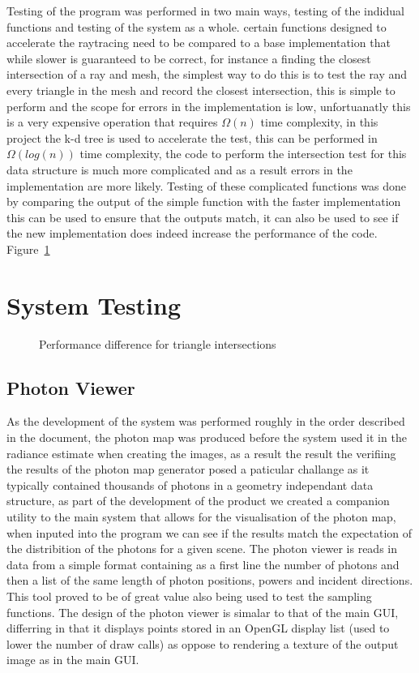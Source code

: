 Testing of the program was performed in two main ways, testing of the indidual functions and testing of the system as a whole.
certain functions designed to accelerate the raytracing need to be compared to a base implementation that while slower is
guaranteed to be correct, for instance a finding the closest intersection of a ray and mesh, the simplest way to do this
is to test the ray and every triangle in the mesh and record the closest intersection, this is simple to perform and
the scope for errors in the implementation is low, unfortuanatly this is a very expensive operation that requires $\Omega(n)$
time complexity, in this project the k-d tree is used to accelerate the test, this can be performed in $\Omega(log(n))$ time
complexity, the code to perform the intersection test for this data structure is much more complicated and as a result
errors in the implementation are more likely. Testing of these complicated functions was done by comparing the output
of the simple function with the faster implementation this can be used to ensure that the outputs match, it can also be
used to see if the new implementation does indeed increase the performance of the code. Figure~\ref{fig:testing_performance_comp}

\section{System Testing}
\begin{figure}[h!]
\label{fig:testing_performance_comp}
\caption{Performance difference for triangle intersections}
\end{figure}

\subsection{Photon Viewer}
As the development of the system was performed roughly in the order described in the document, the photon map was produced before the
system used it in the radiance estimate when creating the images, as a result the result the verifiing the results of the photon
map generator posed a paticular challange as it typically contained thousands of photons in a geometry independant data structure, as
part of the development of the product we created a companion utility to the main system that allows for the visualisation of the
photon map, when inputed into the program we can see if the results match the expectation of the distribition of the photons for a
given scene. The photon viewer is reads in data from a simple format containing as a first line the number of photons and then
a list of the same length of photon positions, powers and incident directions. This tool proved to be of great value also being used
to test the sampling functions. The design of the photon viewer is simalar to that of the main GUI, differring in that it displays points
stored in an OpenGL display list \cite{khronos:2014:online}  (used to lower the number of draw calls) as oppose to rendering a
texture of the output image as in the main GUI.

